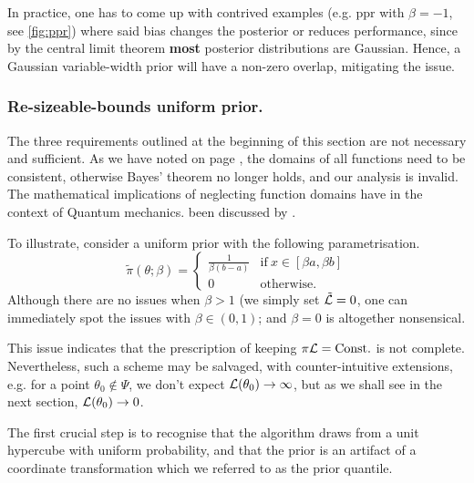 \documentclass[usenatbib]{mnras}
\begin{document}
In practice, one has to come up with contrived examples (e.g. ppr
with \(\beta=-1\), see \autoref{fig:ppr}) where said bias changes the
posterior or reduces performance, since by the central limit
theorem \textbf{most} posterior distributions are Gaussian. Hence, a
Gaussian variable-width prior will have a non-zero overlap,
mitigating the issue.

\subsubsection{Re-sizeable-bounds uniform prior.}
\label{sec:orgbf91ab9}

The three requirements outlined at the beginning of this section
are not necessary and sufficient. As we have noted on page
\pageref{domain-discussion}, the domains of all functions need to be
consistent, otherwise Bayes' theorem no longer holds, and our
analysis is invalid. The mathematical implications of neglecting
function domains have in the context of Quantum mechanics. been
discussed by \cite{Gieres_2000}.

To illustrate, consider a uniform prior with the following
parametrisation.
\begin{equation}
  \tilde{\pi}(\theta; \beta) =
  \begin{cases}
	\frac{1}{\beta(b-a)} & \text{if}\ x \in [\beta a, \beta b] \\
	0 & \text{otherwise}.
  \end{cases}
\end{equation}
Although there are no issues when \(\beta>1\) (we simply set \({\cal
	\tilde{L}}=0\), one can immediately spot the issues with \(\beta \in (0,1)\);
and \(\beta=0\) is altogether nonsensical.

This issue indicates that the prescription of keeping \(\pi {\cal
	L} = \text{Const.}\) is not complete. Nevertheless, such a scheme
may be salvaged, with counter-intuitive extensions, e.g. for a
point \(\theta_{0} \notin \Psi\), we don't expect \({\cal
	L}(\theta_{0}) \rightarrow \infty\), but as we shall see in the
next section, \({\cal L}(\theta_{0}) \rightarrow 0\).

The first crucial step is to recognise that the algorithm draws
from a unit hypercube with uniform probability, and that the prior
is an artifact of a coordinate transformation which we referred to
as the prior quantile.
\end{document}
